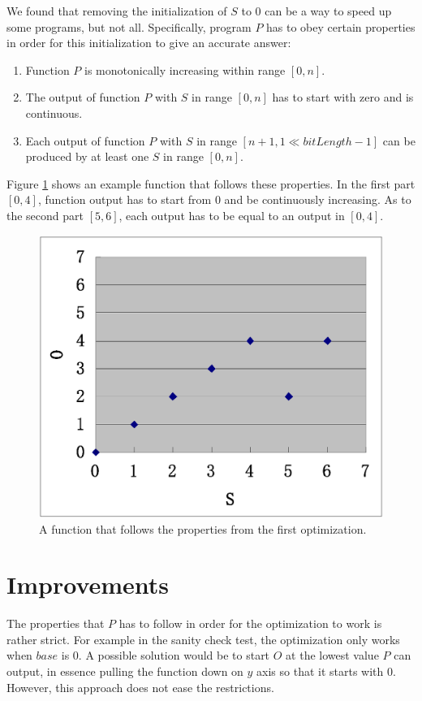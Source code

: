 We found that removing the initialization of $S$ to $0$ can be a way to speed up some programs, but not all. 
Specifically, program $P$ has to obey certain properties in order for this initialization to give an accurate answer:

\begin{enumerate}
\item Function $P$ is monotonically increasing within range $[0, n]$.
\item The output of function $P$ with $S$ in range $[0, n]$ has to start with zero and is continuous.
\item Each output of function $P$ with $S$ in range $[n+1, 1\ll bitLength-1]$ can be produced by at least one $S$ in range $[0, n]$.
\end{enumerate}

Figure \ref{fig:1stTry} shows an example function that follows these properties. In the first part $[0, 4]$, function output has to start from $0$ and be continuously increasing. As to the second part $[5, 6]$, each output has to be equal to an output in $[0, 4]$.

\begin{figure}
\centering
\includegraphics[scale=0.8]{Figures/1stTry}
\caption{A function that follows the properties from the first optimization.}
\label{fig:1stTry}
\end{figure}

\section{Improvements}
The properties that $P$ has to follow in order for the optimization to work is rather strict. For example in the sanity check test, the optimization only works when $base$ is $0$. A possible solution would be to start $O$ at the lowest value $P$ can output, in essence pulling the function down on $y$ axis so that it starts with $0$. However, this approach does not ease the restrictions.


